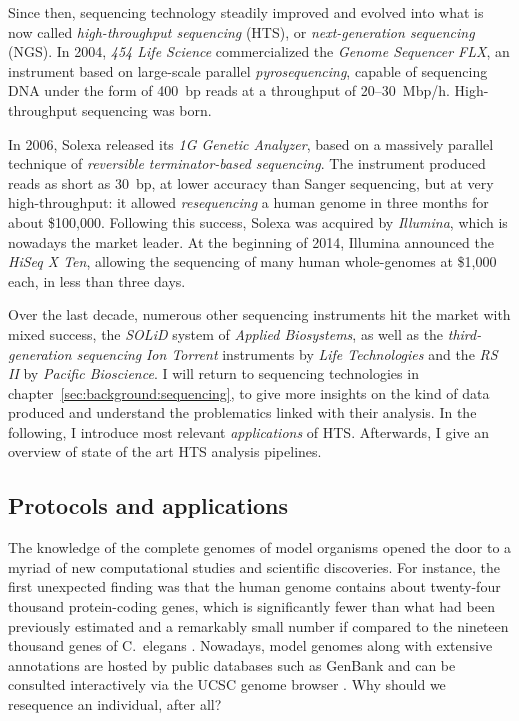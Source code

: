 Since then, sequencing technology steadily improved and evolved into what is now called \emph{high-throughput sequencing} (HTS), or \emph{next-generation sequencing} (NGS).
In 2004, \emph{454 Life Science} commercialized the \emph{Genome Sequencer FLX}, an instrument based on large-scale parallel \emph{pyrosequencing}, capable of sequencing DNA under the form of 400~bp reads at a throughput of 20--30~Mbp/h.
High-throughput sequencing was born.

In 2006, Solexa released its \emph{1G Genetic Analyzer}, based on a massively parallel technique of \emph{reversible terminator-based sequencing}.
The instrument produced reads as short as 30~bp, at lower accuracy than Sanger sequencing, but at very high-throughput: it allowed \emph{resequencing} a human genome in three months for about \$100,000.
Following this success, Solexa was acquired by \emph{Illumina}, which is nowadays the market leader.
At the beginning of 2014, Illumina announced the \emph{HiSeq X Ten}, allowing the sequencing of many human whole-genomes at \$1,000 each, in less than three days.

Over the last decade, numerous other sequencing instruments hit the market with mixed success, \eg the \emph{SOLiD} system of \emph{Applied Biosystems}, as well as the \emph{third-generation sequencing} \emph{Ion Torrent} instruments by \emph{Life Technologies} and the \emph{RS II} by \emph{Pacific Bioscience}.
I will return to sequencing technologies in chapter~\ref{sec:background:sequencing}, to give more insights on the kind of data produced and understand the problematics linked with their analysis.
In the following, I introduce most relevant \emph{applications} of HTS.
Afterwards, I give an overview of state of the art HTS analysis pipelines.

\subsection{Protocols and applications}

The knowledge of the complete genomes of model organisms opened the door to a myriad of new computational studies and scientific discoveries.
For instance, the first unexpected finding was that the human genome contains about twenty-four thousand protein-coding genes, which is significantly fewer than what had been previously estimated and a remarkably small number if compared to the nineteen thousand genes of C.~elegans \citep{Hodgkin2001}.
Nowadays, model genomes along with extensive annotations are hosted by public databases such as GenBank \citep{genbank} and can be consulted interactively \eg via the UCSC genome browser \citep{ucscgb}.
Why should we resequence an individual, after all?

